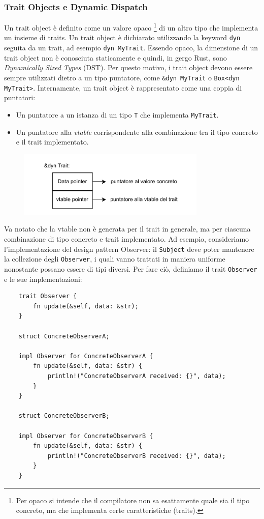 \subsubsection{Trait Objects e Dynamic Dispatch}
\label{sec:trait_objects}
Un trait object è definito come un valore opaco \footnote{Per opaco si intende che il compilatore non sa esattamente quale sia il tipo concreto, ma che implementa certe caratteristiche (traits).} di un altro tipo che implementa un insieme di traits.  Un trait object è dichiarato utilizzando la keyword \texttt{dyn} seguita da un trait, ad esempio \texttt{dyn MyTrait}. Essendo opaco, la dimensione di un trait object non è conosciuta staticamente e quindi, in gergo Rust, sono \textit{Dynamically Sized Types} (DST). Per questo motivo, i trait object devono essere sempre utilizzati dietro a un tipo puntatore, come \texttt{\&dyn MyTrait} o \texttt{Box<dyn MyTrait>}. Internamente, un trait object è rappresentato come una coppia di puntatori:
\begin{itemize}
    \item Un puntatore a un istanza di un tipo \texttt{T} che implementa \texttt{MyTrait}.
    \item Un puntatore alla \textit{vtable} corrispondente alla combinazione tra il tipo concreto e il trait implementato.  
\end{itemize}  
\begin{figure}[H]
    \centering
    \includegraphics[width=0.8\textwidth]{Figures/vtable.drawio.pdf}
\end{figure}
Va notato che la vtable non è generata per il trait in generale, ma per ciascuna combinazione di tipo concreto e trait implementato. Ad esempio, consideriamo l'implementazione del design pattern Observer: il \texttt{Subject} deve poter mantenere la collezione degli \texttt{Observer}, i quali vanno trattati in maniera uniforme nonostante possano essere di tipi diversi. Per fare ciò, definiamo il trait \texttt{Observer} e le sue implementazioni:
\begin{verbatim}
    trait Observer {
        fn update(&self, data: &str);
    }

    struct ConcreteObserverA;

    impl Observer for ConcreteObserverA {
        fn update(&self, data: &str) {
            println!("ConcreteObserverA received: {}", data);
        }
    }

    struct ConcreteObserverB;

    impl Observer for ConcreteObserverB {
        fn update(&self, data: &str) {
            println!("ConcreteObserverB received: {}", data);
        }
    }
\end{verbatim}
